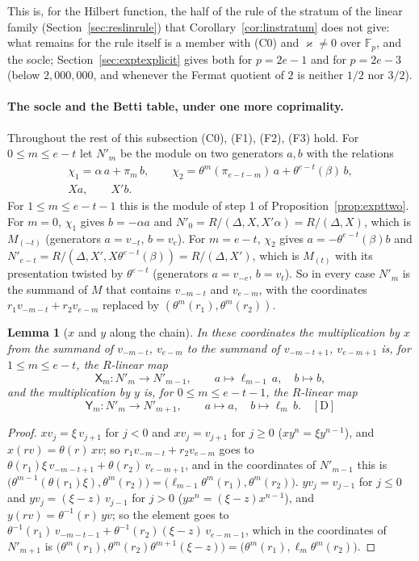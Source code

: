 \documentclass[11pt]{article}
\newtheorem{lemma}{Lemma}
\theoremstyle{definition}
\theoremstyle{remark}
\newcommand{\F}{\mathbb{F}}
\begin{document}
This is, for the Hilbert function, the half of the rule of the stratum of the linear family (Section~\ref{sec:reslinrule}) that Corollary~\ref{cor:linstratum} does not give: what remains for the rule itself is a member with (C0) and $\varkappa\ne0$ over $\F_p$, and the socle; Section~\ref{sec:exptexplicit} gives both for $p=2e-1$ and for $p=2e-3$ (below $2{,}000{,}000$, and whenever the Fermat quotient of $2$ is neither $1/2$ nor $3/2$).


\paragraph{The socle and the Betti table, under one more coprimality.} Throughout the rest of this subsection (C0), (F1), (F2), (F3) hold. For $0\le m\le e-t$ let $N'_m$ be the module on two generators $a,b$ with the relations
\begin{gather*}
\chi_1=\alpha\,a+\pi_m\,b,\qquad\chi_2=\theta^m(\pi_{e-t-m})\,a+\theta^{e-t}(\beta)\,b,\\
Xa,\qquad X'b.
\end{gather*}
For $1\le m\le e-t-1$ this is the module of step 1 of Proposition~\ref{prop:expttwo}. For $m=0$, $\chi_1$ gives $b=-\alpha a$ and $N'_0=R/(\Delta,X,X'\alpha)=R/(\Delta,X)$, which is $M_{(-t)}$ (generators $a=v_{-t}$, $b=v_e$). For $m=e-t$, $\chi_2$ gives $a=-\theta^{e-t}(\beta)b$ and $N'_{e-t}=R/(\Delta,X',X\theta^{e-t}(\beta))=R/(\Delta,X')$, which is $M_{(t)}$ with its presentation twisted by $\theta^{e-t}$ (generators $a=v_{-e}$, $b=v_t$). So in every case $N'_m$ is the summand of $M$ that contains $v_{-m-t}$ and $v_{e-m}$, with the coordinates $r_1v_{-m-t}+r_2v_{e-m}$ replaced by $(\theta^m(r_1),\theta^m(r_2))$.

\begin{lemma}[$x$ and $y$ along the chain]\label{lem:exptchain}
In these coordinates the multiplication by $x$ from the summand of $v_{-m-t}$, $v_{e-m}$ to the summand of $v_{-m-t+1}$, $v_{e-m+1}$ is, for $1\le m\le e-t$, the $R$-linear map
\[
\mathsf X_m:N'_m\to N'_{m-1},\qquad a\mapsto\ell_{m-1}\,a,\quad b\mapsto b,
\]
and the multiplication by $y$ is, for $0\le m\le e-t-1$, the $R$-linear map
\[
\mathsf Y_m:N'_m\to N'_{m+1},\qquad a\mapsto a,\quad b\mapsto\ell_m\,b.\quad[\mathrm D]
\]
\end{lemma}
\begin{proof}
$xv_j=\xi\,v_{j+1}$ for $j<0$ and $xv_j=v_{j+1}$ for $j\ge0$ ($xy^n=\xi y^{n-1}$), and $x(rv)=\theta(r)\,xv$; so $r_1v_{-m-t}+r_2v_{e-m}$ goes to $\theta(r_1)\xi\,v_{-m-t+1}+\theta(r_2)\,v_{e-m+1}$, and in the coordinates of $N'_{m-1}$ this is $\bigl(\theta^{m-1}(\theta(r_1)\xi),\theta^m(r_2)\bigr)=\bigl(\ell_{m-1}\theta^m(r_1),\theta^m(r_2)\bigr)$. $yv_j=v_{j-1}$ for $j\le0$ and $yv_j=(\xi-z)\,v_{j-1}$ for $j>0$ ($yx^n=(\xi-z)x^{n-1}$), and $y(rv)=\theta^{-1}(r)\,yv$; so the element goes to $\theta^{-1}(r_1)\,v_{-m-t-1}+\theta^{-1}(r_2)(\xi-z)\,v_{e-m-1}$, which in the coordinates of $N'_{m+1}$ is $\bigl(\theta^m(r_1),\theta^m(r_2)\theta^{m+1}(\xi-z)\bigr)=\bigl(\theta^m(r_1),\ell_m\theta^m(r_2)\bigr)$.
\end{proof}
\end{document}
